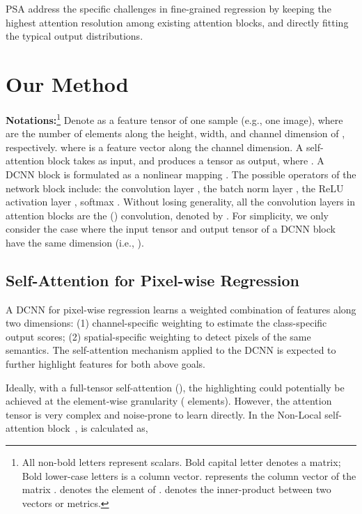 \documentclass[10pt,twocolumn,letterpaper]{article}
\begin{document}
PSA address the specific challenges in fine-grained regression by keeping the highest attention resolution among existing attention blocks, and directly fitting the typical output distributions.


 
 \section{Our Method}
\textbf{Notations:}\footnote{All non-bold letters represent scalars. Bold capital letter  denotes a matrix; Bold lower-case letters  is a column vector.  represents the  column vector of the matrix .  denotes the  element of .   denotes the inner-product between two vectors or metrics.}  Denote 
  as a feature tensor of one sample (e.g., one image), where  are the number of elements along the height, width, and channel dimension of , respectively.  
  where  is a feature vector along the channel dimension.  
 A  self-attention block  takes  as input, and produces a tensor  as output, where . A DCNN block is formulated as a nonlinear mapping . The possible operators of the network block include: the convolution layer , the batch norm  layer , the ReLU activation layer , softmax . Without losing generality, all the convolution layers in attention blocks are the () convolution, denoted by .  For simplicity, we only consider the case where the input tensor  and output tensor  of a DCNN block have the same dimension   (i.e., ).

\subsection{Self-Attention for Pixel-wise Regression}

A DCNN for pixel-wise regression learns a weighted combination of features along two dimensions: (1) channel-specific weighting to estimate the class-specific output scores; (2) spatial-specific weighting to detect pixels of the same semantics. The self-attention mechanism applied to the DCNN is expected to further highlight features for both above goals. 

Ideally, with a full-tensor self-attention  (), the highlighting could potentially be achieved at the element-wise granularity ( elements). However, the attention tensor  is very complex and noise-prone to learn directly. In the Non-Local self-attention block~\cite{Wang18nonlocal},  is calculated as,  
\end{document}
